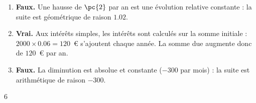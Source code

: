 {\begin{enumerate}
\item \textbf{Faux.} Une hausse de $\pc{2}$ par an est une évolution relative constante : la suite est géométrique de raison $\num{1,02}$.
\item \textbf{Vrai.} Aux intérêts simples, les intérêts sont calculés sur la somme initiale : $\num{2000}\times\num{0,06}=120$~€ s'ajoutent chaque année. La somme due augmente donc de $120$~€ par an.
\item \textbf{Faux.} La diminution est absolue et constante ($-300$ par mois) : la suite est arithmétique de raison $-300$.
\end{enumerate}
}{6}

